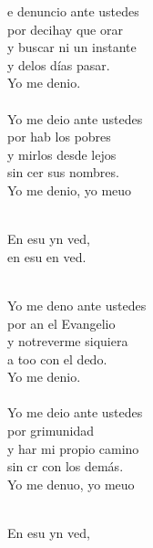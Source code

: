 \begin{cancion}%
	e denuncio ante ustedes \\
	por decihay que orar \\
	y  buscar ni un instante \\
	y delos días pasar. \\
	Yo me denio. \\
\jump\\
	Yo me deio ante ustedes \\
	por hab los pobres \\
	y mirlos desde lejos \\
	sin cer sus nombres. \\
	Yo me denio, yo meuo\\\jump\\
	\begin{chorus}%
	En esu yn ved, \\
	en esu en ved.\\
	\end{chorus}%
	\jump\\
	Yo me deno ante ustedes \\
	por an el Evangelio \\
	y notreverme siquiera \\
	a too con el dedo. \\
	Yo me denio. \\
\jump\\
	Yo me deio ante ustedes \\
	por grimunidad \\
	y har mi propio camino \\
	sin cr con los demás. \\
	Yo me denuo, yo meuo\\\jump\\
	\begin{chorus}%
	En esu yn ved, \\

\end{chorus}
\end{cancion}
